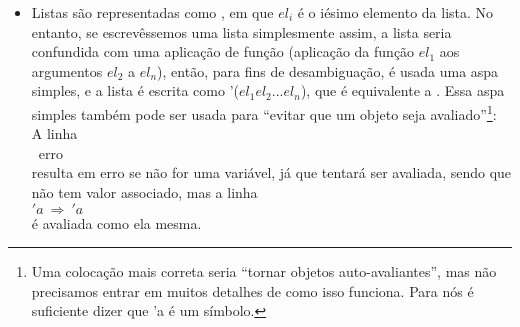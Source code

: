 \documentclass{article}
\begin{document}
\begin{itemize}
\item Listas são representadas como , em que $el_i$ é o iésimo elemento da lista. No entanto, se
  escrevêssemos uma lista simplesmente assim, a lista seria
  confundida com uma aplicação de função (aplicação da função $el_1$
  aos argumentos $el_2$ a $el_n$), então, para fins de
  desambiguação, é usada uma aspa simples, e a lista é escrita como
  '($el_1 el_2 ... el_n$), que é equivalente a  . Essa aspa simples também pode ser usada para
  ``evitar que um objeto seja avaliado''\footnote{Uma colocação mais
    correta seria ``tornar objetos auto-avaliantes'', mas não
    precisamos entrar em muitos detalhes de como isso funciona. Para
    nós é suficiente dizer que 'a é um símbolo.}:\\
  A linha\\
   \seta\ erro\\
  resulta em erro se  não for uma variável, já que
  tentará ser avaliada, sendo que  não tem valor
  associado, mas a linha\\
  $'a\ \Rightarrow\ 'a$\\
  é avaliada como ela mesma.\\


\end{itemize}
\end{document}

